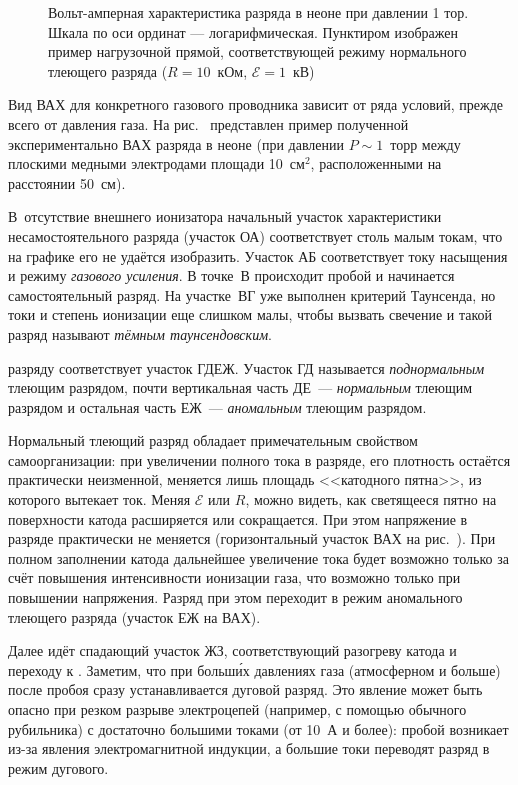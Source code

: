 \begin{figure}[h!]
    \centering
    \caption{Вольт-амперная характеристика разряда в неоне при давлении 1 тор. 
        Шкала по оси ординат --- логарифмическая.
        Пунктиром изображен пример нагрузочной прямой,
        соответствующей режиму нормального тлеющего разряда
        ($R=10$~кОм, $\mathcal{E}=1$~кВ)}
\end{figure}

Вид ВАХ для конкретного газового проводника зависит от ряда условий, прежде
всего от давления газа. На рис.~ представлен пример
полученной экспериментально ВАХ разряда в неоне (при давлении $P\sim 1$~торр
между плоскими медными электродами площади 10~см$^2$, расположенными на
расстоянии 50~см).

В~отсутствие внешнего ионизатора начальный участок
характеристики несамостоятельного разряда (участок ОА) соответствует столь
малым токам, что на графике его не удаётся изобразить. Участок 
АБ соответствует току насыщения и режиму \emph{газового усиления}. 
В точке~В происходит пробой и начинается самостоятельный
разряд. На участке~ВГ уже выполнен критерий Таунсенда, но 
токи и степень ионизации еще слишком малы, чтобы вызвать свечение 
и такой разряд называют \emph{тёмным таунсендовским}.

 разряду соответствует участок ГДЕЖ.
Участок ГД называется \emph{поднормальным} тлеющим разрядом,
почти вертикальная часть ДЕ~--- \emph{нормальным} тлеющим разрядом и
остальная часть ЕЖ~--- \emph{аномальным} тлеющим разрядом.

Нормальный тлеющий разряд обладает примечательным свойством самоорганизации:
при увеличении полного тока в разряде, его плотность остаётся практически
неизменной, меняется лишь площадь <<катодного пятна>>, из которого вытекает ток.
Меняя $\mathcal{E}$ или $R$, можно видеть, как светящееся пятно
на поверхности катода расширяется или сокращается.
При этом напряжение в разряде практически не меняется
(горизонтальный участок ВАХ на рис.~).
При полном заполнении катода дальнейшее увеличение тока будет возможно только за
счёт повышения интенсивности ионизации газа, что возможно только при повышении
напряжения. Разряд при этом переходит в режим аномального тлеющего разряда
(участок ЕЖ на ВАХ).

Далее идёт спадающий участок ЖЗ, соответствующий разогреву катода и 
переходу к . Заметим, что при больш\'{и}х давлениях газа
(атмосферном и больше) после пробоя сразу устанавливается дуговой разряд.
Это явление может быть опасно при резком разрыве электроцепей (например, с помощью
обычного рубильника) с достаточно большими токами (от 10~А и более): пробой
возникает из-за явления электромагнитной индукции, а большие токи 
переводят разряд в режим дугового.

